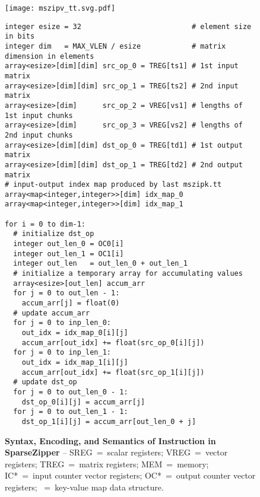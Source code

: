 \lstset{style=python-style}

\begin{figure*}[tp]
\centering


\texttt{[image: mszipv\_tt.svg.pdf]}
\begin{lstlisting}[xleftmargin=0.025\tw]
integer esize = 32                          # element size in bits
integer dim   = MAX_VLEN / esize            # matrix dimension in elements
array<esize>[dim][dim] src_op_0 = TREG[ts1] # 1st input matrix
array<esize>[dim][dim] src_op_1 = TREG[ts2] # 2nd input matrix
array<esize>[dim]      src_op_2 = VREG[vs1] # lengths of 1st input chunks
array<esize>[dim]      src_op_3 = VREG[vs2] # lengths of 2nd input chunks
array<esize>[dim][dim] dst_op_0 = TREG[td1] # 1st output matrix
array<esize>[dim][dim] dst_op_1 = TREG[td2] # 2nd output matrix
# input-output index map produced by last mszipk.tt
array<map<integer,integer>>[dim] idx_map_0
array<map<integer,integer>>[dim] idx_map_1

for i = 0 to dim-1:
  # initialize dst_op
  integer out_len_0 = OC0[i]
  integer out_len_1 = OC1[i]
  integer out_len   = out_len_0 + out_len_1
  # initialize a temporary array for accumulating values
  array<esize>[out_len] accum_arr
  for j = 0 to out_len - 1:
    accum_arr[j] = float(0)
  # update accum_arr
  for j = 0 to inp_len_0:
    out_idx = idx_map_0[i][j]
    accum_arr[out_idx] += float(src_op_0[i][j])
  for j = 0 to inp_len_1:
    out_idx = idx_map_1[i][j]
    accum_arr[out_idx] += float(src_op_1[i][j])
  # update dst_op
  for j = 0 to out_len_0 - 1:
    dst_op_0[i][j] = accum_arr[j]
  for j = 0 to out_len_1 - 1:
    dst_op_1[i][j] = accum_arr[out_len_0 + j]
\end{lstlisting}

\caption[Stream Value Zipping Instruction in SparseZipper]{
  \textbf{Syntax, Encoding, and Semantics of  Instruction in SparseZipper} --
  SREG~=~scalar registers;
  VREG~=~vector registers;
  TREG~=~matrix registers;
  MEM~=~memory;
  IC*~=~input counter vector registers;
  OC*~=~output counter vector registers;
  ~=~key-value map data structure.
}
\label{fig:spz-mszipv-inst}
\end{figure*}
